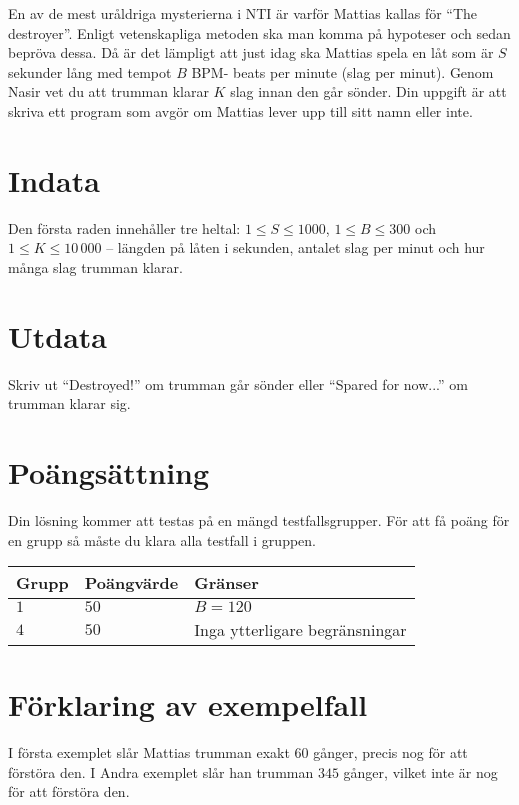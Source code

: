 En av de mest uråldriga mysterierna i NTI är varför Mattias kallas för ``The destroyer''. Enligt vetenskapliga metoden ska man komma på hypoteser och sedan bepröva dessa.
Då är det lämpligt att just idag ska Mattias spela en låt som är $S$ sekunder lång med tempot $B$ BPM- beats per minute (slag per minut). Genom Nasir vet du att trumman klarar 
$K$ slag innan den går sönder. Din uppgift är att skriva ett program som avgör om Mattias lever upp till sitt namn eller inte.


\section*{Indata}
Den första raden innehåller tre heltal: $1\leq S \leq 1000$, $1 \leq B \leq 300$ och $1 \leq K \leq 10\,000$ -- längden på låten i sekunden, antalet slag per minut och hur många slag trumman klarar. 

\section*{Utdata}
Skriv ut ``Destroyed!'' om trumman går sönder eller ``Spared for now...'' om trumman klarar sig.

\section*{Poängsättning}
Din lösning kommer att testas på en mängd testfallsgrupper.
För att få poäng för en grupp så måste du klara alla testfall i gruppen.

\noindent
\begin{tabular}{| l | l | p{12cm} |}
  \hline
  Grupp & Poängvärde & Gränser \\ \hline
  $1$   & $50$       & $B=120$ \\ \hline
  $4$   & $50$       & Inga ytterligare begränsningar  \\ \hline
\end{tabular}

\section*{Förklaring av exempelfall}
I första exemplet slår Mattias trumman exakt $60$ gånger, precis nog för att förstöra den.
I Andra exemplet slår han trumman $345$ gånger, vilket inte är nog för att förstöra den.
